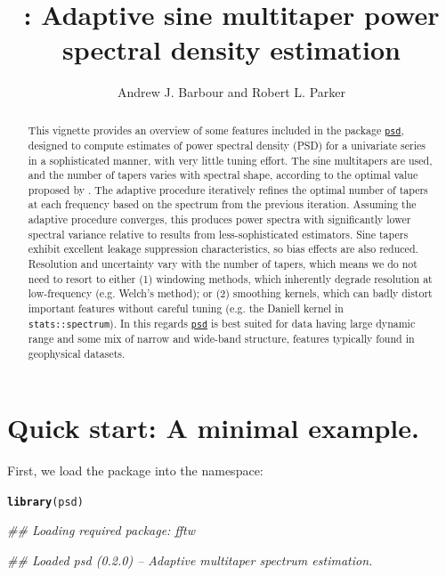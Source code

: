 \documentclass{article}\usepackage{graphicx, color}
\author{Andrew J. Barbour and Robert L. Parker}
\title{\psd{}: Adaptive sine multitaper power spectral density estimation}
\makeatletter
\newcommand{\hlfunctioncall}[1]{\textcolor[rgb]{0.501960784313725,0,0.329411764705882}{\textbf{#1}}}%
\newenvironment{kframe}{%
 \def\at@end@of@kframe{}%
 \ifinner\ifhmode%
  \def\at@end@of@kframe{\end{minipage}}%
  \begin{minipage}{\columnwidth}%
 \fi\fi%
 \def\FrameCommand##1{\hskip\@totalleftmargin \hskip-\fboxsep
 \colorbox{shadecolor}{##1}\hskip-\fboxsep
     \hskip-\linewidth \hskip-\@totalleftmargin \hskip\columnwidth}%
 \MakeFramed {\advance\hsize-\width
   \@totalleftmargin\z@ \linewidth\hsize
   \@setminipage}}%
 {\par\unskip\endMakeFramed%
 \at@end@of@kframe}
\newenvironment{knitrout}{}{} %
\newcommand{\Rcmd}[1]{\texttt{#1}}
\newcommand{\psd}[0]{\href{http://abarbour.github.com/psd/}{\color{blue}\Rcmd{psd}}}
\makeatother
\begin{document}
\maketitle
\begin{abstract}
  This vignette provides an overview of some 
  features included in the package \psd{}, designed to
  compute estimates of power spectral
  density (PSD) for a univariate series in a sophisticated manner,
  with very little tuning effort.
  The sine multitapers are used, and
  the number of tapers varies with spectral shape, according
  to the optimal value proposed by \citet{rs1995}.
  The adaptive procedure
  iteratively refines the optimal number of tapers at each frequency
  based on the spectrum from the previous iteration.
  Assuming the adaptive procedure converges, 
  this produces power spectra
  with significantly
  lower spectral variance 
  relative to results from less-sophisticated estimators.
  Sine tapers exhibit excellent
  leakage suppression characteristics, so bias effects
  are also reduced.
  Resolution and uncertainty vary with the number of tapers,
  which means we do
  not need to resort to either (1) windowing methods,
  which inherently degrade resolution at low-frequency
  (e.g. Welch's method); or (2) smoothing kernels,
  which can badly distort important features without careful tuning
  (e.g. the Daniell kernel in \Rcmd{stats::spectrum}).
  In this regards
  \psd{} is best suited for data having 
   large dynamic range and some mix of narrow and wide-band structure,
   features typically found in geophysical datasets.
\end{abstract}

\tableofcontents
\pagebreak

\section{Quick start: A minimal example.}
First, we load the package into the namespace:


\begin{knitrout}
\color{fgcolor}\begin{kframe}
\begin{alltt}
\hlfunctioncall{library}(psd)
\end{alltt}


{\ttfamily\noindent\itshape\textcolor{messagecolor}{\#\# Loading required package: fftw}}

{\ttfamily\noindent\itshape\textcolor{messagecolor}{\#\# Loaded psd (0.2.0) -- Adaptive multitaper spectrum estimation.}}\end{kframe}
\end{knitrout}
\end{document}
